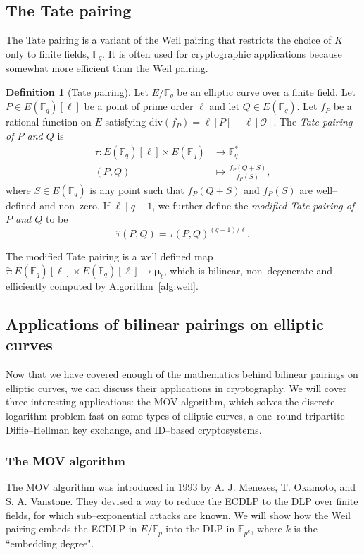 \documentclass[9pt]{article}
\theoremstyle{definition}
\newtheorem{definition}{Definition}[section]
\begin{document}
\subsection{The Tate pairing}
The Tate pairing is a variant of the Weil pairing that restricts the choice of $K$ only to finite fields, $\mathbb{F}_q$. It is often used for cryptographic applications because somewhat more efficient than the Weil pairing.

\begin{definition}[Tate pairing]
Let $E/\mathbb{F}_q$ be an elliptic curve over a finite field. Let $P \in E(\mathbb{F}_q)[\ell]$ be a point of prime order $\ell$ and let $Q \in E(\mathbb{F}_q)$. Let $f_P$ be a rational function on $E$ satisfying $\text{div}(f_P) =  \ell[P] - \ell[\mathcal{O}]$. The \textit{Tate pairing of $P$ and $Q$} is
\begin{align*}
    \tau : E(\mathbb{F}_q)[\ell] \times E(\mathbb{F}_q) &\longrightarrow \mathbb{F}_q^\ast \\
          (P, Q) &\longmapsto \frac{f_P(Q + S)}{f_P(S)},
\end{align*}
where $S \in E(\mathbb{F}_q)$ is any point such that $f_P(Q + S)$ and $f_P(S)$ are well--defined and non--zero. If $\ell \;\vert\; q - 1$, we further define the \textit{modified Tate pairing of $P$ and $Q$} to be
$$\hat{\tau}(P, Q) = \tau(P, Q)^{(q-1)/\ell}.$$
\end{definition}

The modified Tate pairing is a well defined map $\hat{\tau} : E(\mathbb{F}_q)[\ell] \times E(\mathbb{F}_q)[\ell] \to \bm{\mu}_\ell$, which is bilinear, non--degenerate and efficiently computed by Algorithm~\ref{alg:weil}.

\subsection{Applications of bilinear pairings on elliptic curves}
Now that we have covered enough of the mathematics behind bilinear pairings on elliptic curves, we can discuss their applications in cryptography. We will cover three interesting applications: the MOV algorithm, which solves the discrete logarithm problem fast on some types of elliptic curves, a one--round tripartite Diffie--Hellman key exchange, and ID--based cryptosystems.

\subsubsection{The MOV algorithm}
The MOV algorithm was introduced in 1993 by A. J. Menezes, T. Okamoto, and S. A. Vanstone. They devised a way to reduce the ECDLP to the DLP over finite fields, for which sub--exponential attacks are known. We will show how the Weil pairing embeds the ECDLP in $E/\mathbb{F}_p$ into the DLP in $\mathbb{F}_{p^k}$, where $k$ is the ``embedding degree".
\end{document}
